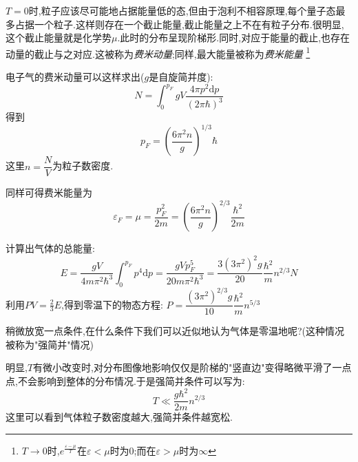     $T=0$时,粒子应该尽可能地占据能量低的态,但由于泡利不相容原理,每个量子态最多占据一个粒子.这样则存在一个截止能量,截止能量之上不在有粒子分布.很明显,这个截止能量就是化学势$\mu$.此时的分布呈现阶梯形.同时,对应于能量的截止,也存在动量的截止与之对应.这被称为\emph{费米动量};同样,最大能量被称为\emph{费米能量}
    \footnote{
      $T \rightarrow 0$时,$e^{\frac{\varepsilon-\mu}{T}}$在$\varepsilon<\mu$时为0;而在$\varepsilon>\mu$时为$\infty$
    }

    电子气的费米动量可以这样求出($g$是自旋简并度):
    \begin{equation}
      N=\int_0^{p_F}gV\dfrac{4\pi p^{2}\mathrm{d} p}{(2\pi\hbar)^{3}}
    \end{equation}
    得到 
    \begin{equation}
      p_F=(\dfrac{6\pi^{2}n}{g} )^{1 / 3 }\hbar
    \end{equation}
    这里$n=\dfrac{N}{V}$为粒子数密度.

    同样可得费米能量为
    \begin{equation}
      \varepsilon_F=\mu=\dfrac{p_F^{2}}{2m}=(\dfrac{6\pi^{2}n}{g})^{2 / 3}\dfrac{\hbar^{2}}{2m}
    \end{equation}

    计算出气体的总能量:
    \begin{equation}
      E=\dfrac{gV}{4m\pi^{2}\hbar^{3}}\int_0^{p_F}p^{4}\mathrm{d} p=\dfrac{gV p_F^{5}}{20 m \pi ^{2}\hbar^{3}}=\dfrac{3(3\pi^{2})^{2}g}{20}\dfrac{\hbar^{2}}{m}n^{2 / 3}N
    \end{equation}
    利用$PV=\frac{2}{3}E$,得到零温下的物态方程:
    $P=\dfrac{(3\pi^{2})^{2 / 3}g}{10}\dfrac{\hbar^{2}}{m}n^{5 / 3}$
    
    \vspace*{0.4cm}

    稍微放宽一点条件,在什么条件下我们可以近似地认为气体是零温地呢?(这种情况被称为"强简并"情况)

    明显,$T$有微小改变时,对分布图像地影响仅仅是阶梯的"竖直边"变得略微平滑了一点点,不会影响到整体的分布情况.于是强简并条件可以写为:
    \begin{equation}
      T\ll \dfrac{g\hbar^{2}}{2m}n^{2 / 3}
    \end{equation}
    这里可以看到气体粒子数密度越大,强简并条件越宽松.

